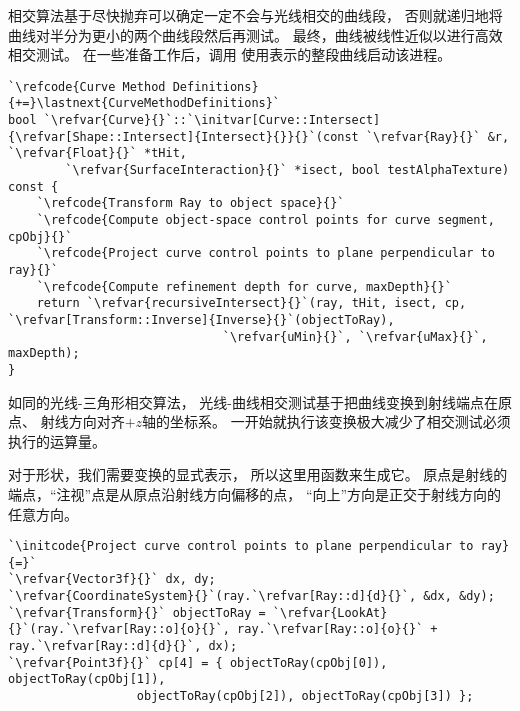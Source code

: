 相交算法基于尽快抛弃可以确定一定不会与光线相交的曲线段，
否则就递归地将曲线对半分为更小的两个曲线段然后再测试。
最终，曲线被线性近似以进行高效相交测试。
在一些准备工作后，调用
使用表示的整段曲线启动该进程。
\begin{lstlisting}
`\refcode{Curve Method Definitions}{+=}\lastnext{CurveMethodDefinitions}`
bool `\refvar{Curve}{}`::`\initvar[Curve::Intersect]{\refvar[Shape::Intersect]{Intersect}{}}{}`(const `\refvar{Ray}{}` &r, `\refvar{Float}{}` *tHit,
        `\refvar{SurfaceInteraction}{}` *isect, bool testAlphaTexture) const {
    `\refcode{Transform Ray to object space}{}`
    `\refcode{Compute object-space control points for curve segment, cpObj}{}`
    `\refcode{Project curve control points to plane perpendicular to ray}{}`
    `\refcode{Compute refinement depth for curve, maxDepth}{}`
    return `\refvar{recursiveIntersect}{}`(ray, tHit, isect, cp, `\refvar[Transform::Inverse]{Inverse}{}`(objectToRay),
                              `\refvar{uMin}{}`, `\refvar{uMax}{}`, maxDepth);
}
\end{lstlisting}

如同的光线-三角形相交算法，
光线-曲线相交测试基于把曲线变换到射线端点在原点、
射线方向对齐$+z$轴的坐标系。
一开始就执行该变换极大减少了相交测试必须执行的运算量。

对于形状，我们需要变换的显式表示，
所以这里用函数来生成它。
原点是射线的端点，“注视”点是从原点沿射线方向偏移的点，
“向上”方向是正交于射线方向的任意方向。
\begin{lstlisting}
`\initcode{Project curve control points to plane perpendicular to ray}{=}`
`\refvar{Vector3f}{}` dx, dy;
`\refvar{CoordinateSystem}{}`(ray.`\refvar[Ray::d]{d}{}`, &dx, &dy);
`\refvar{Transform}{}` objectToRay = `\refvar{LookAt}{}`(ray.`\refvar[Ray::o]{o}{}`, ray.`\refvar[Ray::o]{o}{}` + ray.`\refvar[Ray::d]{d}{}`, dx);
`\refvar{Point3f}{}` cp[4] = { objectToRay(cpObj[0]), objectToRay(cpObj[1]),
                  objectToRay(cpObj[2]), objectToRay(cpObj[3]) };
\end{lstlisting}

